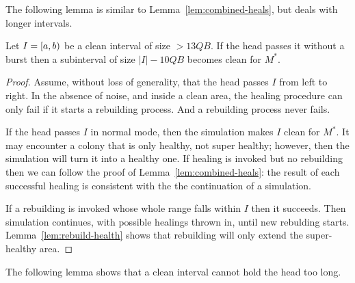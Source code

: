 \documentclass[12pt]{memoir}
\def\B{B}
\newcommand{\Q}{Q}
\begin{document}
The following lemma is similar to Lemma~\ref{lem:combined-heals}, but deals with longer intervals.

\begin{lemma}\label{lem:rebuild-pass}
Let \( I=\left[a,b\right) \) be a clean interval of size \( > 13 \Q\B \).
If the head passes it without a burst then a subinterval of size \( |I|-10\Q\B \)
becomes clean for \( M^{*} \).
\end{lemma}
\begin{proof}
Assume, without loss of generality, that the head passes \( I \) from left to right.
In the absence of noise, and inside a clean area,
the healing procedure can only fail if it starts a rebuilding process.
And a rebuilding process never fails.

If the head passes \( I \) in normal mode, then
the simulation makes \( I \) clean for \( M^{*} \).
It may encounter a colony that is only healthy, not super healthy;
however, then the simulation will turn it into a healthy one.
If healing is invoked but no rebuilding then we can follow the proof of Lemma~\ref{lem:combined-heals}:
the result of each successful healing is consistent with the the continuation of a simulation.

If a rebuilding is invoked whose whole range falls within \( I \) then it succeeds.
Then simulation continues, with possible healings thrown in, until new rebulding starts.
Lemma~\ref{lem:rebuild-health} shows that rebuilding will only extend the super-healthy area.
\end{proof}

The following lemma shows that a clean interval cannot hold the head too long.
\end{document}
